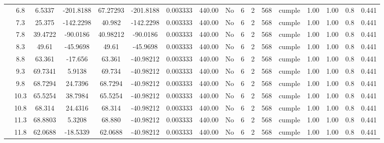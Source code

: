 \begin{table}[H]
{\begin{tabular}{|c|c|c|c|c|c|c|c|c|c|c|c|c|c|c|c|c|}
\cline{2-17}        & \cellcolor[rgb]{ .851,  .882,  .949}6.8 & 6.5337 & -201.8188 & 67.27293 & -201.8188 & 0.003333 & 440.00 & No  & 6   & 2   & 568 & \cellcolor[rgb]{ .776,  .937,  .808}cumple & 1.00 & 1.00 & 0.8 & 0.441 \bigstrut\\
\cline{2-17}        & 7.3 & 25.375 & -142.2298 & 40.982 & -142.2298 & 0.003333 & 440.00 & No  & 6   & 2   & 568 & \cellcolor[rgb]{ .776,  .937,  .808}cumple & 1.00 & 1.00 & 0.8 & 0.441 \bigstrut\\
\cline{2-17}        & 7.8 & 39.4722 & -90.0186 & 40.98212 & -90.0186 & 0.003333 & 440.00 & No  & 6   & 2   & 568 & \cellcolor[rgb]{ .776,  .937,  .808}cumple & 1.00 & 1.00 & 0.8 & 0.441 \bigstrut\\
\cline{2-17}        & 8.3 & 49.61 & -45.9698 & 49.61 & -45.9698 & 0.003333 & 440.00 & No  & 6   & 2   & 568 & \cellcolor[rgb]{ .776,  .937,  .808}cumple & 1.00 & 1.00 & 0.8 & 0.441 \bigstrut\\
\cline{2-17}        & 8.8 & 63.361 & -17.656 & 63.361 & -40.98212 & 0.003333 & 440.00 & No  & 6   & 2   & 568 & \cellcolor[rgb]{ .776,  .937,  .808}cumple & 1.00 & 1.00 & 0.8 & 0.441 \bigstrut\\
\cline{2-17}        & 9.3 & 69.7341 & 5.9138 & 69.734 & -40.98212 & 0.003333 & 440.00 & No  & 6   & 2   & 568 & \cellcolor[rgb]{ .776,  .937,  .808}cumple & 1.00 & 1.00 & 0.8 & 0.441 \bigstrut\\
\cline{2-17}        & 9.8 & 68.7294 & 24.7396 & 68.7294 & -40.98212 & 0.003333 & 440.00 & No  & 6   & 2   & 568 & \cellcolor[rgb]{ .776,  .937,  .808}cumple & 1.00 & 1.00 & 0.8 & 0.441 \bigstrut\\
\cline{2-17}        & 10.3 & 65.5254 & 38.7984 & 65.5254 & -40.98212 & 0.003333 & 440.00 & No  & 6   & 2   & 568 & \cellcolor[rgb]{ .776,  .937,  .808}cumple & 1.00 & 1.00 & 0.8 & 0.441 \bigstrut\\
\cline{2-17}        & 10.8 & 68.314 & 24.4316 & 68.314 & -40.98212 & 0.003333 & 440.00 & No  & 6   & 2   & 568 & \cellcolor[rgb]{ .776,  .937,  .808}cumple & 1.00 & 1.00 & 0.8 & 0.441 \bigstrut\\
\cline{2-17}        & 11.3 & 68.8803 & 5.3208 & 68.880 & -40.98212 & 0.003333 & 440.00 & No  & 6   & 2   & 568 & \cellcolor[rgb]{ .776,  .937,  .808}cumple & 1.00 & 1.00 & 0.8 & 0.441 \bigstrut\\
\cline{2-17}        & 11.8 & 62.0688 & -18.5339 & 62.0688 & -40.98212 & 0.003333 & 440.00 & No  & 6   & 2   & 568 & \cellcolor[rgb]{ .776,  .937,  .808}cumple & 1.00 & 1.00 & 0.8 & 0.441 \bigstrut\\

\end{tabular}}
\end{table}
